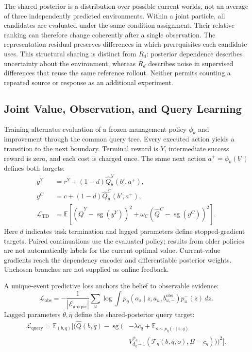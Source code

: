 \documentclass[sigconf,anonymous,review]{acmart}
\DeclareMathOperator{\sg}{sg}
\newcommand{\E}{\mathbb{E}}
\theoremstyle{zhplain}
\begin{document}
The shared posterior is a distribution over possible current worlds, not an average of three independently predicted environments. Within a joint particle, all candidates are evaluated under the same condition assignment. Their relative ranking can therefore change coherently after a single observation. The representation residual preserves differences in which prerequisites each candidate uses. This structural sharing is distinct from \(R_d\): posterior dependence describes uncertainty about the environment, whereas \(R_d\) describes noise in supervised differences that reuse the same reference rollout. Neither permits counting a repeated source or response as an additional experiment.

\subsection{Joint Value, Observation, and Query Learning}
Training alternates evaluation of a frozen management policy \(\phi_k\) and improvement through the common query tree. Every executed action yields a transition to the next boundary. Terminal reward is \(Y\), intermediate success reward is zero, and each cost is charged once. The same next action \(a^+=\phi_k(b')\) defines both targets:
\begin{equation}
\begin{aligned}
y^Y&=r^Y+(1-d)\hat Q_{\bar\theta}^Y(b',a^+),\\
y^C&=c+(1-d)\hat Q_{\bar\theta}^C(b',a^+),\\
\mathcal L_{\mathrm{TD}}&=\E[(\hat Q^Y-\sg(y^Y))^2+\omega_C(\hat Q^C-\sg(y^C))^2].
\end{aligned}
\label{eq:td}
\end{equation}
Here \(d\) indicates task termination and lagged parameters define stopped-gradient targets. Paired continuations use the evaluated policy; results from older policies are not automatically labels for the current optimal value. Current-value gradients reach the dependency encoder and differentiable posterior weights. Unchosen branches are not supplied as online feedback.

A unique-event predictive loss anchors the belief to observable evidence:
\begin{equation}
\mathcal L_{\mathrm{obs}}=-\frac1{|\mathcal E_{\mathrm{unique}}|}\sum_u
\log\!\int p_\eta(o_u\mid z,a_u,b_{u,-}^{\mathrm{obs}})p_u^-(z)\,dz.
\label{eq:obs}
\end{equation}
Lagged parameters \(\bar\theta,\bar\eta\) define the shared-posterior query target:
\begin{equation}
\begin{aligned}
\mathcal L_{\mathrm{query}}=\E_{(b,q)}\Big[\big(\hat Q(b,q)-\sg\big(&-\lambda c_q+\E_{o\sim p_{\bar\eta}(\cdot\mid b,q)}\\
&V_{d_q-1}^{\phi_k}(\mathcal T_{\bar\eta}(b,q,o),B-c_q)\big)\big)^2\Big].
\end{aligned}
\label{eq:queryconsistency}
\end{equation}
\end{document}

